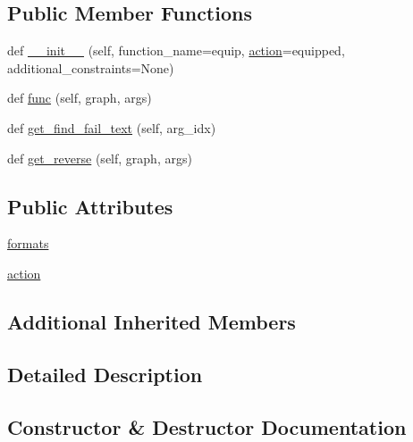 \subsection*{Public Member Functions}
\begin{DoxyCompactItemize}
\item 
def \hyperlink{classlight__chats_1_1graph_1_1EquipObjectFunction_ae9d5525c470e81b3cd05871ceb0bfc36}{\+\_\+\+\_\+init\+\_\+\+\_\+} (self, function\+\_\+name=\textquotesingle{}equip\textquotesingle{}, \hyperlink{classlight__chats_1_1graph_1_1EquipObjectFunction_a43535bde5e33eb613bddfe618f4a4ef6}{action}=\textquotesingle{}equipped\textquotesingle{}, additional\+\_\+constraints=None)
\item 
def \hyperlink{classlight__chats_1_1graph_1_1EquipObjectFunction_a4eaec48030f12c92dcddf9f976b31604}{func} (self, graph, args)
\item 
def \hyperlink{classlight__chats_1_1graph_1_1EquipObjectFunction_a63956c69d130eb078d3c987b8b220190}{get\+\_\+find\+\_\+fail\+\_\+text} (self, arg\+\_\+idx)
\item 
def \hyperlink{classlight__chats_1_1graph_1_1EquipObjectFunction_aa6c4d9ced2e8732087350592441e82bd}{get\+\_\+reverse} (self, graph, args)
\end{DoxyCompactItemize}
\subsection*{Public Attributes}
\begin{DoxyCompactItemize}
\item 
\hyperlink{classlight__chats_1_1graph_1_1EquipObjectFunction_a798cbf33f30601ca3ac770b472ddbe6c}{formats}
\item 
\hyperlink{classlight__chats_1_1graph_1_1EquipObjectFunction_a43535bde5e33eb613bddfe618f4a4ef6}{action}
\end{DoxyCompactItemize}
\subsection*{Additional Inherited Members}


\subsection{Detailed Description}
\begin{DoxyVerb}
\end{DoxyVerb}
 

\subsection{Constructor \& Destructor Documentation}
\mbox{\label{classlight__chats_1_1graph_1_1EquipObjectFunction_ae9d5525c470e81b3cd05871ceb0bfc36}} 
